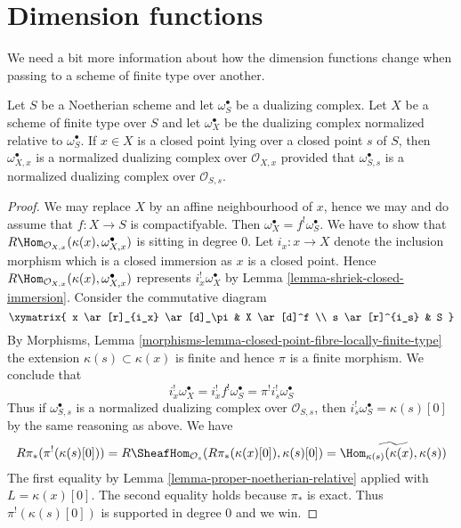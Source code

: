\section{Dimension functions}
\label{section-dimension-functions}

\noindent
We need a bit more information about how the dimension functions change
when passing to a scheme of finite type over another.

\begin{lemma}
\label{lemma-good-dualizing-normalized}
Let $S$ be a Noetherian scheme and let $\omega_S^\bullet$ be a
dualizing complex. Let $X$ be a scheme of finite type over $S$ and let
$\omega_X^\bullet$ be the dualizing complex normalized relative
to $\omega_S^\bullet$. If $x \in X$ is a closed point lying over
a closed point $s$ of $S$, then $\omega_{X, x}^\bullet$
is a normalized dualizing complex over $\mathcal{O}_{X, x}$
provided that $\omega_{S, s}^\bullet$ is a normalized dualizing
complex over $\mathcal{O}_{S, s}$.
\end{lemma}

\begin{proof}
We may replace $X$ by an affine neighbourhood of $x$, hence we may
and do assume that $f : X \to S$ is compactifyable.
Then $\omega_X^\bullet = f^!\omega_S^\bullet$. We have to show that
$R\Hom_{\mathcal{O}_{X, x}}(\kappa(x), \omega_{X, x}^\bullet)$
is sitting in degree $0$. Let $i_x : x \to X$ denote the inclusion
morphism which is a closed immersion as $x$ is a closed point.
Hence $R\Hom_{\mathcal{O}_{X, x}}(\kappa(x), \omega_{X, x}^\bullet)$
represents $i_x^!\omega_X^\bullet$ by
Lemma \ref{lemma-shriek-closed-immersion}.
Consider the commutative diagram
$$
\xymatrix{
x \ar[r]_{i_x} \ar[d]_\pi & X \ar[d]^f \\
s \ar[r]^{i_s} & S
}
$$
By Morphisms, Lemma
\ref{morphisms-lemma-closed-point-fibre-locally-finite-type}
the extension $\kappa(s) \subset \kappa(x)$ is finite and hence
$\pi$ is a finite morphism. We conclude that
$$
i_x^!\omega_X^\bullet = i_x^! f^! \omega_S^\bullet =
\pi^! i_s^! \omega_S^\bullet
$$
Thus if $\omega_{S, s}^\bullet$ is a normalized dualizing complex
over $\mathcal{O}_{S, s}$, then $i_s^!\omega_S^\bullet = \kappa(s)[0]$
by the same reasoning as above. We have
$$
R\pi_*(\pi^!(\kappa(s)[0])) =
R\SheafHom_{\mathcal{O}_s}(R\pi_*(\kappa(x)[0]), \kappa(s)[0]) =
\widetilde{\Hom_{\kappa(s)}(\kappa(x), \kappa(s))}
$$
The first equality by Lemma \ref{lemma-proper-noetherian-relative}
applied with $L = \kappa(x)[0]$. The second equality holds because
$\pi_*$ is exact.
Thus $\pi^!(\kappa(s)[0])$ is supported in degree $0$ and we win.
\end{proof}

